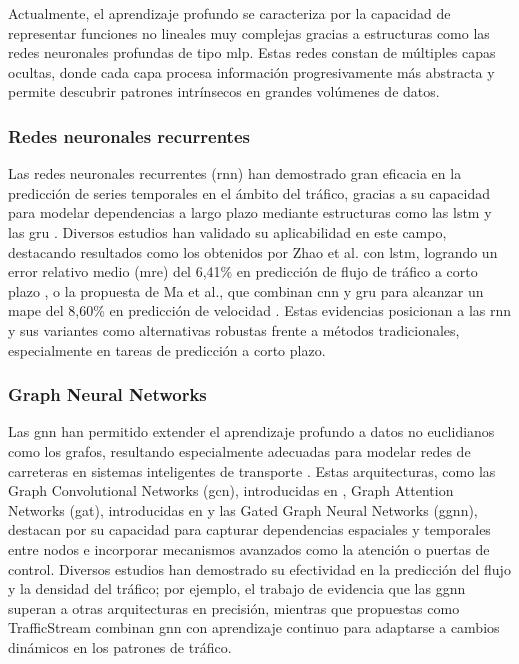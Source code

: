 Actualmente, el aprendizaje profundo se caracteriza por la capacidad de representar funciones no lineales muy complejas gracias a estructuras como las redes neuronales profundas de tipo \acrlong{mlp}. Estas redes constan de múltiples capas ocultas, donde cada capa procesa información progresivamente más abstracta y permite descubrir patrones intrínsecos en grandes volúmenes de datos.

\subsubsection*{Redes neuronales recurrentes}

Las redes neuronales recurrentes (\acrfull{rnn}) han demostrado gran eficacia en la predicción de series temporales en el ámbito del tráfico, gracias a su capacidad para modelar dependencias a largo plazo mediante estructuras como las \acrshort{lstm} \cite{hochreiter1997long} y las \acrshort{gru} \cite{cho2014gru}. Diversos estudios han validado su aplicabilidad en este campo, destacando resultados como los obtenidos por Zhao et al. con \acrshort{lstm}, logrando un error relativo medio (\acrshort{mre}) del 6,41\% en predicción de flujo de tráfico a corto plazo \cite{zhao2017lstm}, o la propuesta de Ma et al., que combinan \acrshort{cnn} y \acrshort{gru} para alcanzar un \acrshort{mape} del 8,60\% en predicción de velocidad \cite{ma2022cnn_gru}. Estas evidencias posicionan a las \acrshort{rnn} y sus variantes como alternativas robustas frente a métodos tradicionales, especialmente en tareas de predicción a corto plazo.

\subsubsection*{Graph Neural Networks}

Las \acrlong{gnn} han permitido extender el aprendizaje profundo a datos no euclidianos como los grafos, resultando especialmente adecuadas para modelar redes de carreteras en sistemas inteligentes de transporte \cite{theoryGnn}. Estas arquitecturas, como las Graph Convolutional Networks (\acrshort{gcn}), introducidas en \cite{theoryGcn}, Graph Attention Networks (\acrshort{gat}), introducidas en \cite{theoryGan} y las Gated Graph Neural Networks (\acrshort{ggnn}), destacan por su capacidad para capturar dependencias espaciales y temporales entre nodos e incorporar mecanismos avanzados como la atención o puertas de control. Diversos estudios han demostrado su efectividad en la predicción del flujo y la densidad del tráfico; por ejemplo, el trabajo de \cite{forecastGgnn} evidencia que las \acrshort{ggnn} superan a otras arquitecturas en precisión, mientras que propuestas como TrafficStream \cite{forecastGnn} combinan \acrshort{gnn} con aprendizaje continuo para adaptarse a cambios dinámicos en los patrones de tráfico.


